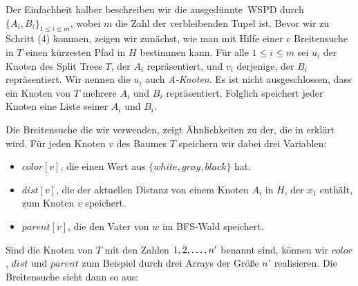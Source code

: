     Der Einfachheit halber beschreiben wir die \glqq ausgedünnte\grqq\ WSPD durch $\{A_i, B_i\}_{1\leq i \leq m}$, wobei $m$ die Zahl der verbleibenden Tupel ist.
    Bevor wir zu Schritt (4) kommen, zeigen wir zunächst, wie man mit Hilfe einer c Breitensuche in $T$ einen kürzesten Pfad in $H$ bestimmen kann.  
    Für alle $1 \leq i \leq m$ sei $u_i$ der Knoten des Split Trees $T$, der $A_i$ repräsentiert, und $v_i$ derjenige, der $B_i$ repräsentiert. Wir nennen die $u_i$ auch \emph{A-Knoten}. Es ist nicht ausgeschlossen, dass ein Knoten von $T$ mehrere $A_i$ und $B_i$ repräsentiert. Folglich speichert jeder Knoten eine Liste seiner $A_i$ und $B_i$.
    
    Die Breitensuche die wir verwenden, zeigt Ähnlichkeiten zu der, die in \cite{hagerup} erklärt wird. Für jeden Knoten $v$ des Baumes $T$ speichern wir dabei drei Variablen:
    \begin{itemize}
    	\item $color[v]$, die einen Wert aus $\{white, gray, black\}$ hat.
    	\item $dist[v]$, die der aktuellen Distanz von einem Knoten $A_i$ in $H$, der $x_1$ enthält, zum Knoten $v$ speichert.
    	\item $parent[v]$, die den Vater von $w$ im BFS-Wald speichert.
    \end{itemize}
    Sind die Knoten von $T$ mit den Zahlen $1, 2,\mathellipsis, n'$ benannt sind, können wir $color$, $dist$ und $parent$ zum Beispiel durch drei Arrays der Größe $n'$ realisieren.
    Die Breitensuche sieht dann so aus:
    
